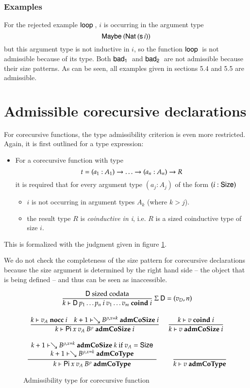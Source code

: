 \subsubsection{Examples}

For the rejected example $\mathsf{loop}\:$, $i$ is occurring in the argument type \[\mathsf{Maybe}\: (\mathsf{Nat}\: (\mathsf{s}\, i))\] but this argument type is not inductive in $i$, so the function $\mathsf{loop}\:$ is not admissible because of its type.
Both $\mathsf{bad_1}\:$ and $\mathsf{bad_2}\:$ are not admissible because their size patterns. 
As can be seen, all examples given in sections 5.4 and 5.5 are admissible.

\section{Admissible corecursive declarations}

For corecursive functions, the type admissibility criterion is even more restricted.
Again, it is first outlined for a type expression:
\begin{itemize}
\item
For a corecursive function with type \[t = (a_1 : A_1) \rightarrow \ldots \rightarrow (a_n : A_n) \rightarrow R\] it is required that 
for every argument type $(a_j : A_j)$ of the form $(i : \mathsf{Size})$  
\begin{itemize}
\item
$i$ is not occurring in argument types $A_k$ (where $k > j$). 
\item
the result type $R$ is \emph{coinductive in i}, i.e. $R$ is a sized coinductive type of size $i$. 
\end{itemize}
\end{itemize}
This is formalized with the judgment given in figure \ref{coadm}.

We do not check the completeness of the size pattern for corecursive declarations because the size argument is determined by the right hand side -- the object that is being defined -- and thus can be seen as inaccessible. 


\begin{figure}[htp]
\begin{gather*}
\ \dfrac{\mathsf{D} \mbox{ sized codata}}{k\vdash\mathsf{D} \: p_1 \ldots p_n \: i \: v_1 \ldots v_m\mbox{ \textbf{coind} }i}
{\: \Sigma \: \mathsf{D} = (v_D,n)}
\\[2ex]
\ \dfrac{k\vdash v_A\mbox{ \textbf{nocc} }i
\quad
k+1\vdash\searrow B^{\rho,x=k}\mbox{ \textbf{admCoSize} }i}{k\vdash\mathsf{Pi} \: x \: v_A \: B^{\rho}\mbox{ \textbf{admCoSize} }i}
\quad
\ \dfrac{k\vdash v\mbox{ \textbf{coind} }i}{k\vdash v\mbox{ \textbf{admCoSize} }i}
\\[2ex]
\ \dfrac{\begin{array}[b]{c}k+1\vdash\searrow B^{\rho,x=k}\mbox{ \textbf{admCoSize} }k \mbox{ if } v_A = \mathsf{Size}\\k+1\vdash\searrow B^{\rho,x=k}\mbox{ \textbf{admCoType}}\end{array}}{k\vdash\mathsf{Pi} \: x \: v_A \: B^{\rho}\mbox{ \textbf{admCoType}}}
\qquad
\ \dfrac{}{k\vdash v\mbox{ \textbf{admCoType}}}
\end{gather*}
\caption{Admissibility type for corecursive function}
\label{coadm}
\end{figure}


